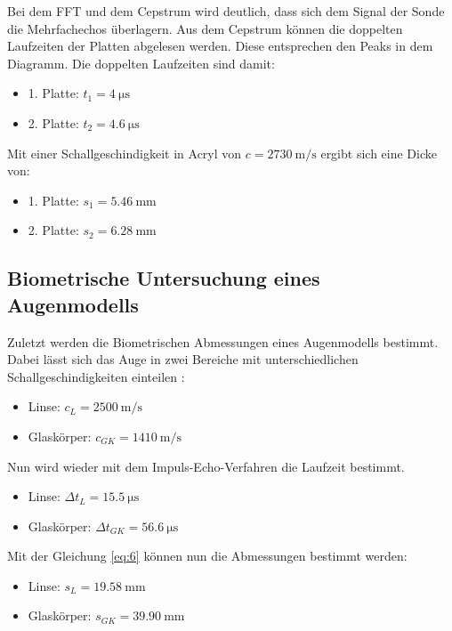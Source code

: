 Bei dem FFT und dem Cepstrum wird deutlich, dass sich dem Signal der Sonde die Mehrfachechos
überlagern. Aus dem Cepstrum können die doppelten Laufzeiten der Platten abgelesen werden.
Diese entsprechen den Peaks in dem Diagramm. Die doppelten Laufzeiten sind damit:

\begin{itemize}
  \item 1. Platte: $t_1 = \SI{4}{\micro\second}$
  \item 2. Platte: $t_2 = \SI{4.6}{\micro\second}$
\end{itemize}

Mit einer Schallgeschindigkeit in Acryl von $c = \SI{2730}{\meter\per\second}$ ergibt sich
eine Dicke von:

\begin{itemize}
  \item 1. Platte: $s_1 = \SI{5.46}{\milli\meter}$
  \item 2. Platte: $s_2 = \SI{6.28}{\milli\meter}$
\end{itemize}

\subsection{Biometrische Untersuchung eines Augenmodells}

Zuletzt werden die Biometrischen Abmessungen eines Augenmodells bestimmt. Dabei lässt
sich das Auge in zwei Bereiche mit unterschiedlichen Schallgeschindigkeiten einteilen \cite{1}:

\begin{itemize}
  \item Linse: $c_L = \SI{2500}{\meter\per\second}$
  \item Glaskörper: $c_{GK} = \SI{1410}{\meter\per\second}$
\end{itemize}

Nun wird wieder mit dem Impuls-Echo-Verfahren die Laufzeit bestimmt.

\begin{itemize}
  \item Linse: $\Delta t_L = \SI{15.5}{\micro\second}$
  \item Glaskörper: $\Delta t_{GK} = \SI{56.6}{\micro\second}$
\end{itemize}

Mit der Gleichung \ref{eq:6} können nun die Abmessungen bestimmt werden:

\begin{itemize}
  \item Linse: $s_L = \SI{19.58}{\milli\meter}$
  \item Glaskörper: $s_{GK} = \SI{39.90}{\milli\meter}$
\end{itemize}
